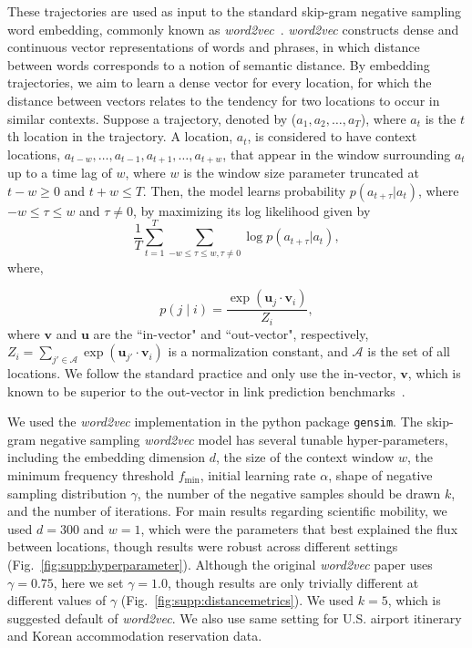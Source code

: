 \documentclass[12pt]{article} %
\def\given{\mid}
\begin{document}
These trajectories are used as input to the standard skip-gram negative sampling word embedding, commonly known as \textit{word2vec}~\autocite{mikolov2013word2vec}.
\textit{word2vec} constructs dense and continuous vector representations of words and phrases, in which distance between words corresponds to a notion of semantic distance.
By embedding trajectories, we aim to learn a dense vector for every location, for which the distance between vectors relates to the tendency for two locations to occur in similar contexts.
Suppose a trajectory, denoted by ($a_{1}, a_{2}, \ldots, a_{T}$), where $a_{t}$ is the $t$th location in the trajectory. A location, $a_{t}$, is considered to have context locations, $a_{t-w}, \ldots, a_{t-1}, a_{t+1},\ldots, a_{t+w}$, that appear in the window surrounding $a_t$ up to a time lag of $w$, where $w$ is the window size parameter truncated at $t - w \geq 0$ and $t + w \leq T$. Then, the model learns probability $p(a_{t + \tau} \vert a_{t})$, where $-w\leq \tau\leq w$ and $\tau \neq 0$,  by maximizing its log likelihood given by
%
%
\begin{equation}
	\frac{1}{T}\sum_{t = 1}^{T} \sum_{-w \leq \tau \leq w, \tau \neq 0} \log p(a_{t + \tau} \vert a_{t}),
\end{equation}
where,

%
%
\begin{equation}
	p(j \given i) = \frac{\exp(\bm{u}_j \cdot \bm{v}_{i})}{Z_i}, \label{eq:cond_prob_w2v}
\end{equation}
where $\bm{v}$ and $\bm{u}$ are the ``in-vector" and ``out-vector", respectively,  $Z_i=\sum_{j' \in \mathcal{A}} \exp(\bm{u}_{j'} \cdot \bm{v}_{i})$ is a normalization constant, and $\mathcal{A}$ is the set of all locations.
We follow the standard practice and only use the in-vector, $\bm{v}$,  which is known to be superior to the out-vector in link prediction benchmarks~\autocite{linzhuo2020hyperbolic, tshitoyan2019mat2vec, garg2018gender, kozlowski2018geometry, hamilton2016diachronic, le2014doc2vec, nakandala2017gendered}.


We used the \textit{word2vec}  implementation in the python package \texttt{gensim}.
The skip-gram negative sampling  \textit{word2vec} model has several tunable hyper-parameters, including the embedding dimension $d$, the size of the context window $w$, the minimum frequency threshold $f_{\min}$, initial learning rate $\alpha$, shape of negative sampling distribution $\gamma$, the number of the negative samples should be drawn $k$, and the number of iterations.
For main results regarding scientific mobility, we used $d=300$ and $w=1$, which were the parameters that best explained the flux between locations, though results were robust across different settings (Fig.~\ref{fig:supp:hyperparameter}).
Although the original \textit{word2vec } paper uses $\gamma = 0.75$\autocite{mikolov2013word2vec}, here we set $\gamma = 1.0$, though results are only trivially different at different values of $\gamma$ (Fig.~\ref{fig:supp:distancemetrics}). We used $k=5$, which is suggested default of \textit{word2vec}.
We also use same setting for U.S. airport itinerary and Korean accommodation reservation data.
\end{document}
